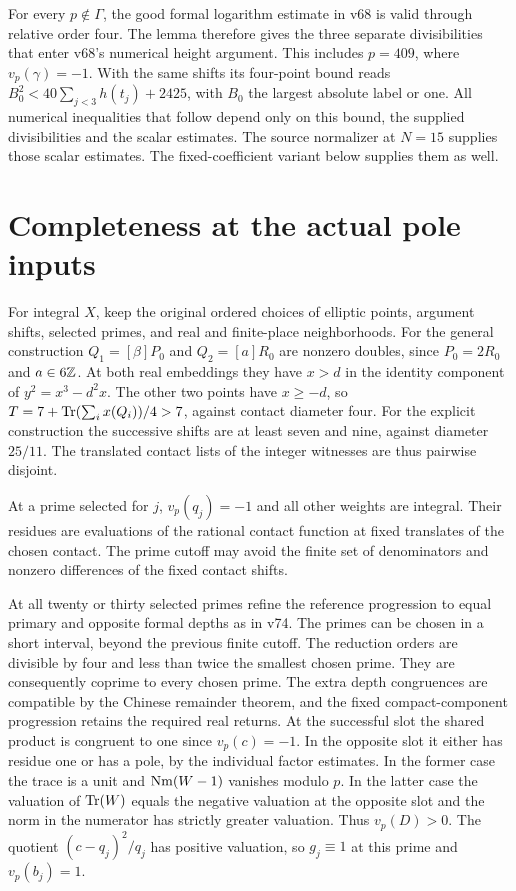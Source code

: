 \documentclass[11pt]{article}
\begin{document}
For every $p\notin\Gamma$, the good formal logarithm estimate in v68 is valid through relative order four. The lemma therefore gives the three separate divisibilities that enter v68's numerical height argument. This includes $p=409$, where $v_p(\gamma)=-1$. With the same shifts its four-point bound reads $B_0^2<40\sum_{j<3} h(t_j)+2425$, with $B_0$ the largest absolute label or one. All numerical inequalities that follow depend only on this bound, the supplied divisibilities and the scalar estimates. The source normalizer at $N=15$ supplies those scalar estimates. The fixed-coefficient variant below supplies them as well.

\section{Completeness at the actual pole inputs}
For integral $X$, keep the original ordered choices of elliptic points, argument shifts, selected primes, and real and finite-place neighborhoods. For the general construction $Q_1=[\beta]P_0$ and $Q_2=[a]R_0$ are nonzero doubles, since $P_0=2R_0$ and $a\in6\mathbb Z$. At both real embeddings they have $x>d$ in the identity component of $y^2=x^3-d^2x$. The other two points have $x\ge-d$, so $T=7+\operatorname{Tr}(\sum_i x(Q_i))/4>7$, against contact diameter four. For the explicit construction the successive shifts are at least seven and nine, against diameter $25/11$. The translated contact lists of the integer witnesses are thus pairwise disjoint.

At a prime selected for $j$, $v_p(q_j)=-1$ and all other weights are integral. Their residues are evaluations of the rational contact function at fixed translates of the chosen contact. The prime cutoff may avoid the finite set of denominators and nonzero differences of the fixed contact shifts.

At all twenty or thirty selected primes refine the reference progression to equal primary and opposite formal depths as in v74. The primes can be chosen in a short interval, beyond the previous finite cutoff. The reduction orders are divisible by four and less than twice the smallest chosen prime. They are consequently coprime to every chosen prime. The extra depth congruences are compatible by the Chinese remainder theorem, and the fixed compact-component progression retains the required real returns. At the successful slot the shared product is congruent to one since $v_p(c)=-1$. In the opposite slot it either has residue one or has a pole, by the individual factor estimates. In the former case the trace is a unit and $\operatorname{Nm}(W-1)$ vanishes modulo $p$. In the latter case the valuation of $\operatorname{Tr}(W)$ equals the negative valuation at the opposite slot and the norm in the numerator has strictly greater valuation. Thus $v_p(D)>0$. The quotient $(c-q_j)^2/q_j$ has positive valuation, so $g_j\equiv1$ at this prime and $v_p(b_j)=1$.
\end{document}

